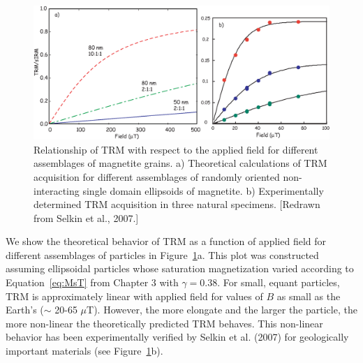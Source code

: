 \begin{figure}[htb]
\centering  \includegraphics[width=14 cm]{EPSfiles/trm.eps}
\caption{Relationship of TRM with respect to the applied field for different assemblages of magnetite grains.  a) Theoretical calculations of TRM acquisition for different assemblages of randomly oriented non-interacting single domain ellipsoids of magnetite.  b) Experimentally determined TRM acquisition in three natural specimens. [Redrawn from Selkin et al., 2007.]}
\label{fig:trm}
\end{figure}  \nocite{selkin07}


We show the theoretical behavior of TRM as a function of applied field for different assemblages of particles in Figure~\ref{fig:trm}a.  This plot was constructed assuming ellipsoidal particles whose saturation magnetization varied according to Equation~\ref{eq:MsT} from Chapter 3 with $\gamma=0.38$.  For small, equant particles,  TRM is approximately linear with applied field for values of $B$ as small
as the Earth's ($\sim$ 20-65 $\mu$T).   However, the more elongate and the larger the particle, the more non-linear the theoretically predicted TRM behaves.  This non-linear behavior has been experimentally verified by 
\nocite{selkin07}
Selkin et al. (2007)  for geologically important materials (see Figure~\ref{fig:trm}b).  


